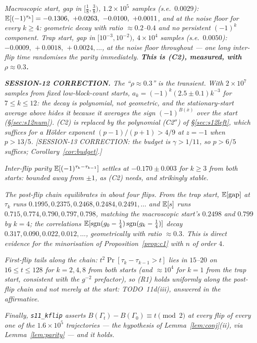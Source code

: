 \emph{Macroscopic start, gap in $[\tfrac18,\tfrac38)$,
$1.2\times10^5$ samples (s.e.\ $0.0029$):
$\E[(-1)^{\tau_k}]=-0.1306,\ +0.0263,\ -0.0100,\ +0.0011$, and at the
noise floor for every $k\ge4$: geometric decay with ratio
$\approx0.2$--$0.4$ and no persistent $(-1)^k$ component.  Trap start,
gap in $[10^{-3},10^{-2})$, $4\times10^4$ samples (s.e.\ $0.0050$):
$-0.0009,\,+0.0018,\,+0.0024,\dots$, at the noise floor throughout ---
one long inter-flip time randomises the parity immediately.
\textbf{This is (C2), measured, with $\rho\approx0.3$.}}

\emph{\textbf{SESSION-12 CORRECTION.}  The ``$\rho\approx0.3$'' is the
transient.  With $2\times10^7$ samples from fixed low-block-count
starts, $a_k=(-1)^k(2.5\pm0.1)k^{-3}$ for $7\le k\le12$: the decay is
polynomial, not geometric, and the stationary-start average above
hides it because it averages the sign $(-1)^{B(\bar x)}$ over the
start (\S\ref{sec:s12num}).  (C2) is replaced by the polynomial
(C2$''$) of \S\ref{sec:s12left}, which suffices for a H\"older exponent
$(p-1)/(p+1)>4/9$ at $z=-1$ when $p>13/5$.  [SESSION-13 CORRECTION: the budget is $\gamma>1/11$, so $p>6/5$ suffices; Corollary~\ref{cor:budget}.]}

\emph{Inter-flip parity $\mathbb{E}[(-1)^{\tau_k-\tau_{k-1}}]$ settles at
$-0.170\pm0.003$ for $k\ge3$ from both starts: bounded away from
$\pm1$, as (C2) needs, and strikingly stable.}

\emph{The post-flip chain equilibrates in about four flips.  From the
trap start, $\mathbb{E}[\mathrm{gap}]$ at $\tau_k$ runs
$0.1995,0.2375,0.2468,0.2484,0.2491,\dots$ and $\mathbb{E}[s]$ runs
$0.715,0.774,0.790,0.797,0.798$, matching the macroscopic start's
$0.2498$ and $0.799$ by $k=4$; the correlations
$\mathbb{E}[\mathrm{sgn}(g_0-\tfrac14)\,\mathrm{sgn}(g_k-\tfrac14)]$ decay
$0.317,0.090,0.022,0.012,\dots$, geometrically with ratio
$\approx0.3$.  This is direct evidence for the minorisation of
Proposition~\ref{prop:c1} with $n$ of order $4$.}

\emph{First-flip tails along the chain: $t^2\Pr[\tau_k-\tau_{k-1}>t]$
lies in $15$--$20$ on $16\le t\le128$ for $k=2,4,8$ from both starts
(and $\approx10^4$ for $k=1$ from the trap start, consistent with the
$g^{-2}$ prefactor), so (R1) holds uniformly \emph{along} the post-flip
chain and not merely at the start: TODO~11d(iii), answered in the
affirmative.}

\emph{Finally, \texttt{s11\_kflip} asserts
$B(\Gamma_t)-B(\Gamma_0)\equiv t\pmod2$ at every flip of every one of
the $1.6\times10^5$ trajectories --- the hypothesis of
Lemma~\ref{lem:conj}(ii), via Lemma~\ref{lem:parity} --- and it holds.}
